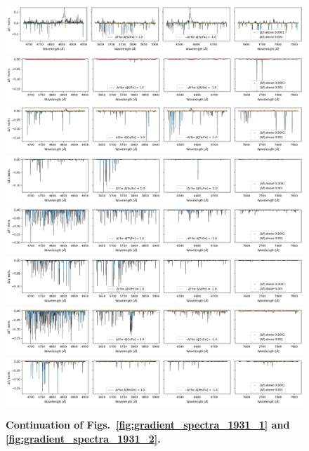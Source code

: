 \documentclass[
  journal=pasa,
  manuscript=research-paper, %
  year=2021,
  volume=37,
]{cup-journal}
\begin{document}
\begin{figure}[hbt!]
 \centering  
 \includegraphics[width=\textwidth]{figures/gradient_spectrum_1931_si_fe.png}
 \includegraphics[width=\textwidth]{figures/gradient_spectrum_1931_k_fe.png}
 \includegraphics[width=\textwidth]{figures/gradient_spectrum_1931_ca_fe.png}
 \includegraphics[width=\textwidth]{figures/gradient_spectrum_1931_sc_fe.png}
 \includegraphics[width=\textwidth]{figures/gradient_spectrum_1931_ti_fe.png}
 \includegraphics[width=\textwidth]{figures/gradient_spectrum_1931_v_fe.png}
 \includegraphics[width=\textwidth]{figures/gradient_spectrum_1931_cr_fe.png}
 \includegraphics[width=\textwidth]{figures/gradient_spectrum_1931_mn_fe.png}
 \caption{\textbf{Continuation of Figs.~\ref{fig:gradient_spectra_1931_1} and \ref{fig:gradient_spectra_1931_2}.}} \label{fig:gradient_spectra_1931_3}
\end{figure}
\end{document}
